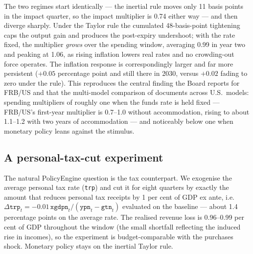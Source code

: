 The two regimes start identically --- the inertial rule moves only 11 basis points in the impact quarter, so the impact multiplier is 0.74 either way --- and then diverge sharply. Under the Taylor rule the cumulated 48-basis-point tightening caps the output gain and produces the post-expiry undershoot; with the rate fixed, the multiplier \emph{grows} over the spending window, averaging 0.99 in year two and peaking at 1.06, as rising inflation lowers real rates and no crowding-out force operates. The inflation response is correspondingly larger and far more persistent ($+0.05$ percentage point and still there in 2030, versus $+0.02$ fading to zero under the rule). This reproduces the central finding the Board reports for FRB/US and that the multi-model comparison of \citet{coenen2012effects} documents across U.S.\ models: spending multipliers of roughly one when the funds rate is held fixed --- FRB/US's first-year multiplier is 0.7--1.0 without accommodation, rising to about 1.1--1.2 with two years of accommodation --- and noticeably below one when monetary policy leans against the stimulus.

\subsection{A personal-tax-cut experiment}
\label{sec:taxcut}

The natural PolicyEngine question is the tax counterpart. We exogenise the average personal tax rate (\texttt{trp}) and cut it for eight quarters by exactly the amount that reduces personal tax receipts by 1 per cent of GDP ex ante, i.e.\ $\Delta \texttt{trp}_t = -0.01\,\texttt{xgdpn}_t/(\texttt{ypn}_t-\texttt{gtn}_t)$ evaluated on the baseline --- about 1.4 percentage points on the average rate. The realised revenue loss is 0.96--0.99 per cent of GDP throughout the window (the small shortfall reflecting the induced rise in incomes), so the experiment is budget-comparable with the purchases shock. Monetary policy stays on the inertial Taylor rule.

